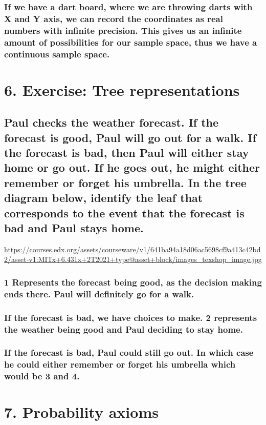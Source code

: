 \documentclass[11pt]{article}
\begin{document}
\subsubsection{If we have a dart board, where we are throwing darts with X and Y axis, we can record the coordinates as real numbers with infinite precision. This gives us an infinite amount of possibilities for our sample space, thus we have a continuous sample space.}
\label{sec:orgcced99f}

\section{6. Exercise: Tree representations}
\label{sec:org0fd695c}
\subsection{Paul checks the weather forecast. If the forecast is good, Paul will go out for a walk. If the forecast is bad, then Paul will either stay home or go out. If he goes out, he might either remember or forget his umbrella. In the tree diagram below, identify the leaf that corresponds to the event that the forecast is bad and Paul stays home.}
\label{sec:org1cde13d}

\url{https://courses.edx.org/assets/courseware/v1/641ba94a18d06ac5698cf9a413c42bd2/asset-v1:MITx+6.431x+2T2021+type@asset+block/images\_texshop\_image.jpg}
\subsubsection{1 Represents the forecast being good, as the decision making ends there. Paul will definitely go for a walk.}
\label{sec:org13fdc9a}
\subsubsection{If the forecast is bad, we have choices to make. 2 represents the weather being good and Paul deciding to stay home.}
\label{sec:org115612b}
\subsubsection{If the forecast is bad, Paul could still go out. In which case he could either remember or forget his umbrella which would be 3 and 4.}
\label{sec:orgd3aa948}
\section{7. Probability axioms}
\label{sec:org31ade46}
\end{document}
